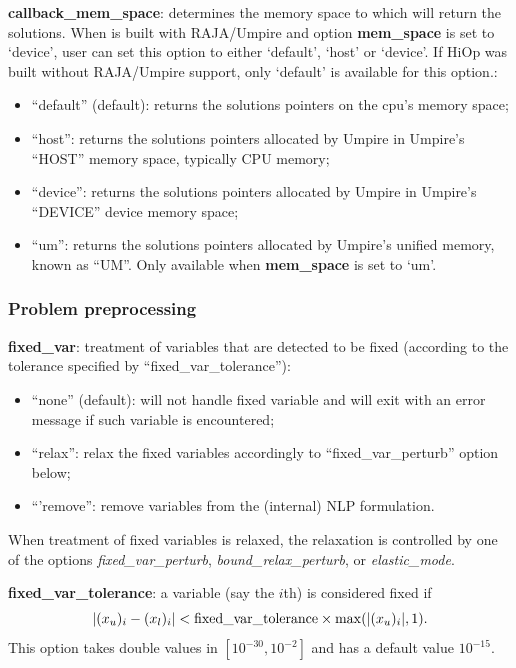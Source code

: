 \noindent \textbf{callback\_mem\_space}: determines the memory space to which \Hi will return the solutions. When \Hi is built with RAJA/Umpire and option \textbf{mem\_space} is set to `device', user can set this option to either `default', `host' or `device'. If HiOp was built without RAJA/Umpire support, only `default' is available for this option.:
\begin{itemize}
\item ``default'' (default): returns the solutions pointers on the cpu's memory space;
\item ``host'':  returns the solutions pointers allocated by Umpire in Umpire's ``HOST'' memory space, typically CPU memory;
\item ``device'': returns the solutions pointers allocated by Umpire in Umpire's ``DEVICE'' device memory space; 
\item ``um'': returns the solutions pointers allocated by Umpire's unified memory, known as ``UM''. Only available when \textbf{mem\_space} is set to `um'.
\end{itemize}
\medskip



\subsubsection{Problem preprocessing}

\noindent \textbf{fixed\_var}: treatment of variables that are detected to be fixed (according to the tolerance specified by ``fixed\_var\_tolerance''):
\begin{itemize}
\item ``none'' (default): will not handle fixed variable and will exit with an error message if such variable is encountered;
\item ``relax'':  relax the fixed variables accordingly to ``fixed\_var\_perturb'' option below;
\item ``'remove'': remove variables from the (internal) NLP formulation.
\end{itemize}
When treatment of fixed variables is relaxed, the relaxation is controlled by one of the options \textit{fixed\_var\_perturb}, \textit{bound\_relax\_perturb}, or \textit{elastic\_mode}.
\medskip

\noindent \textbf{fixed\_var\_tolerance}: a variable (say the $i$th) is considered fixed if 
\begin{displaymath}
|(x_u)_i-(x_l)_i| < \textnormal{fixed\_var\_tolerance} \times \max(|(x_u)_i|,1).
\end{displaymath}
This option takes double values in $[10^{-30}, 10^{-2}]$ and has a default value $10^{-15}$.
\medskip

